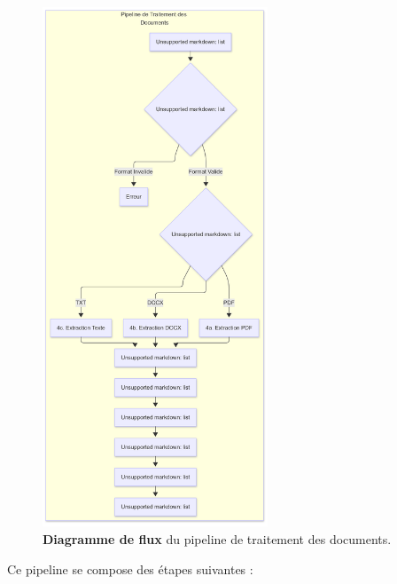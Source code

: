 \begin{figure}[H]
  \centering
  \includegraphics[width=0.6\textwidth,keepaspectratio]{pfe-pics/diagrames/Pipeline de Traitement des Documents (Document Processing Pipeline).png}
  \caption{\textbf{Diagramme de flux} du pipeline de traitement des documents.}
  \label{fig:document_processing_pipeline}
\end{figure}

Ce pipeline se compose des étapes suivantes :

